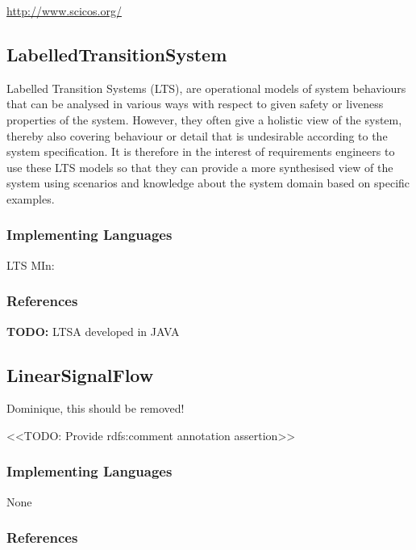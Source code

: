 \url{http://www.scicos.org/}


\subsection{LabelledTransitionSystem}
\label{subsecF:LabelledTransitionSystem}

Labelled  Transition  Systems  (LTS),  are  operational  models  of  system  behaviours that can be analysed in various ways with respect to given safety or liveness properties  of  the  system.   However,  they  often  give  a  holistic  view  of  the system, thereby also covering behaviour or detail that is undesirable according to the system specification.  It is therefore in the interest of requirements engineers to use these LTS models so that they can provide a more synthesised view of the system using scenarios and knowledge about the system domain based on specific examples.

\subsubsection{Implementing Languages}

LTS MIn:


\subsubsection{References}




\textbf{TODO:} LTSA developed in JAVA






\subsection{LinearSignalFlow}
\label{subsecF:LinearSignalFlow}

Dominique, this should be removed!

<<TODO: Provide rdfs:comment annotation assertion>>

\subsubsection{Implementing Languages}

None


\subsubsection{References}





